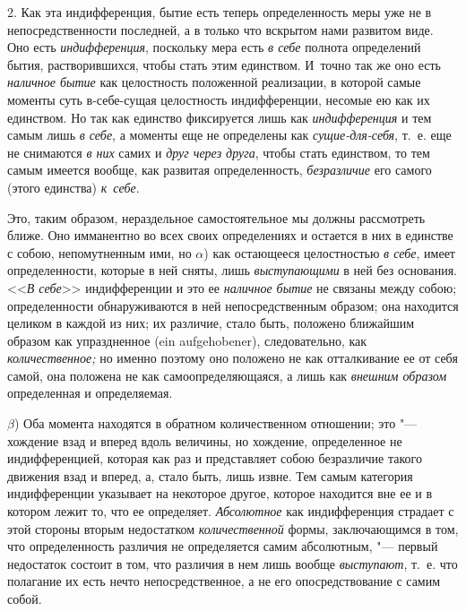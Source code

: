 2. Как эта индифференция, бытие есть теперь определенность меры уже не в
непосредственности последней, а в только что вскрытом нами развитом виде. Оно
есть {\em индифференция}, поскольку мера есть {\em в себе} полнота определений
бытия, растворившихся, чтобы стать этим единством. И~точно так же оно есть
{\em наличное бытие} как целостность положенной реализации, в которой самые
моменты суть в-себе-сущая целостность индифференции, несомые ею как их
единством. Но так как единство фиксируется лишь как {\em индифференция} и тем
самым лишь {\em в себе}, а моменты еще не определены как {\em сущие-для-себя},
т.~е. еще не снимаются {\em в них} самих и {\em друг через друга}, чтобы стать
единством, то тем самым имеется вообще, как развитая определенность,
{\em безразличие} его самого (этого единства) {\em к~себе}.

Это, таким образом, нераздельное самостоятельное мы должны рассмотреть ближе.
Оно имманентно во всех своих определениях и остается в них в единстве с собою,
непомутненным ими, но $\alpha$) как остающееся целостностью {\em в себе}, имеет
определенности, которые в ней сняты, лишь {\em выступающими} в ней без
основания. <<{\em В себе}>> индифференции и это ее {\em наличное бытие} не
связаны между собою; определенности обнаруживаются в ней непосредственным
образом; она находится целиком в каждой из них; их различие, стало быть,
положено ближайшим образом как упраздненное (ein aufgehobener), следовательно,
как {\em количественное;} но именно поэтому оно положено не как отталкивание ее
от себя самой, она положена не как самоопределяющаяся, а лишь как {\em внешним
образом} определенная и определяемая.

$\beta$) Оба момента находятся в обратном количественном отношении; это "---
хождение взад и вперед вдоль величины, но хождение, определенное не
индифференцией, которая как раз и представляет собою безразличие такого
движения взад и вперед, а, стало быть, лишь извне. Тем самым категория
индифференции указывает на некоторое другое, которое находится вне ее и в
котором лежит то, что ее определяет. {\em Абсолютное} как индифференция
страдает с этой стороны вторым недостатком {\em количественной} формы,
заключающимся в том, что определенность различия не определяется самим
абсолютным, "--- первый недостаток состоит в том, что различия в нем лишь
вообще {\em выступают}, т.~е. что полагание их есть нечто непосредственное, а
не его опосредствование с самим собой.

